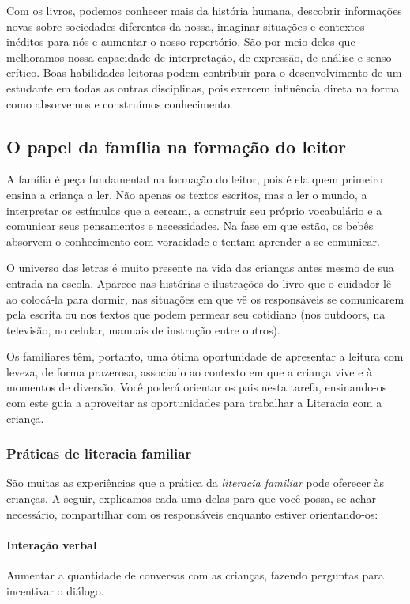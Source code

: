 \documentclass[11pt]{extarticle}
\begin{document}
\begin{enumerate}
Com os livros, podemos conhecer mais da história humana, descobrir informações 
novas sobre sociedades diferentes da nossa, imaginar situações e contextos inéditos 
para nós e aumentar o nosso repertório. São por meio deles que melhoramos nossa 
capacidade de interpretação, de expressão, de análise e senso crítico. Boas habilidades 
leitoras podem contribuir para o desenvolvimento de um estudante em todas as outras 
disciplinas, pois exercem influência direta na forma como absorvemos e 
construímos conhecimento.


\subsection{O papel da família na formação do leitor}
A família é peça fundamental na formação do leitor, pois é ela quem primeiro 
ensina a criança a ler. Não apenas os textos escritos, mas a ler o mundo, a 
interpretar os estímulos que a cercam, a construir seu próprio vocabulário e a 
comunicar seus pensamentos e necessidades. Na fase em que estão, os bebês 
absorvem o conhecimento com voracidade e tentam aprender a se comunicar. 

O universo das letras é muito presente na vida das crianças antes mesmo de sua 
entrada na escola. Aparece nas histórias e ilustrações do livro que o cuidador 
lê ao colocá-la para dormir, nas situações em que vê os responsáveis se comunicarem 
pela escrita ou nos textos que podem permear seu cotidiano (nos outdoors, na 
televisão, no celular, manuais de instrução entre outros). 

Os familiares têm, 
portanto, uma ótima oportunidade de apresentar a leitura com leveza, de forma 
prazerosa, associado ao contexto em que a criança vive e à momentos de diversão. 
Você poderá orientar os pais nesta tarefa, ensinando-os com este guia a aproveitar 
as oportunidades para trabalhar a Literacia com a criança.


\subsubsection{Práticas de literacia familiar} 

São muitas as experiências que a prática da \textit{literacia familiar} 
pode oferecer às crianças. A seguir, explicamos cada uma delas para que você possa, 
se achar necessário, compartilhar com os responsáveis enquanto estiver orientando-os: 

\paragraph{Interação verbal} Aumentar a quantidade de conversas com as 
crianças, fazendo perguntas para incentivar o diálogo.


\end{enumerate}
\end{document}
